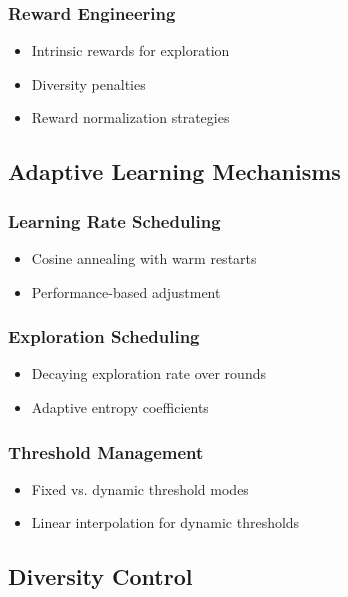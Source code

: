 \documentclass[conference]{IEEEtran}
\begin{document}
\subsubsection{Reward Engineering}
\begin{itemize}
    \item Intrinsic rewards for exploration
    \item Diversity penalties
    \item Reward normalization strategies
\end{itemize}






\subsection{Adaptive Learning Mechanisms}
\subsubsection{Learning Rate Scheduling}
\begin{itemize}
    \item Cosine annealing with warm restarts
    \item Performance-based adjustment
\end{itemize}

\subsubsection{Exploration Scheduling}
\begin{itemize}
    \item Decaying exploration rate over rounds
    \item Adaptive entropy coefficients
\end{itemize}

\subsubsection{Threshold Management}
\begin{itemize}
    \item Fixed vs. dynamic threshold modes
    \item Linear interpolation for dynamic thresholds
\end{itemize}






\subsection{Diversity Control}
\end{document}
